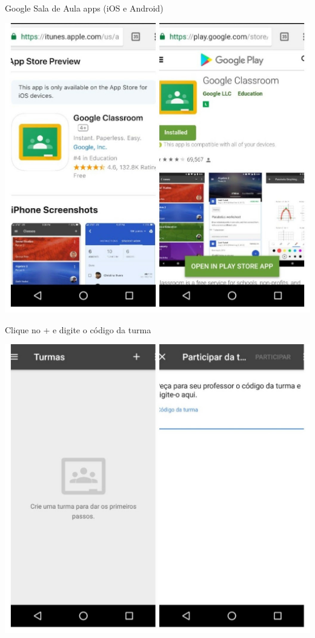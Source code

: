 \documentclass{beamer}
\begin{document}
\begin{frame}{\scriptsize Google Sala de Aula apps (iOS e Android)}
  \begin{center}
    \includegraphics[height=\textheight]{Cap1/gclassroom-apps}
  \end{center}
\end{frame}

\begin{frame}{\scriptsize Clique no + e digite o código da turma}
  \begin{center}
    \includegraphics[height=\textheight]{Cap1/gclassroom-turma}
  \end{center}
\end{frame}
\end{document}
